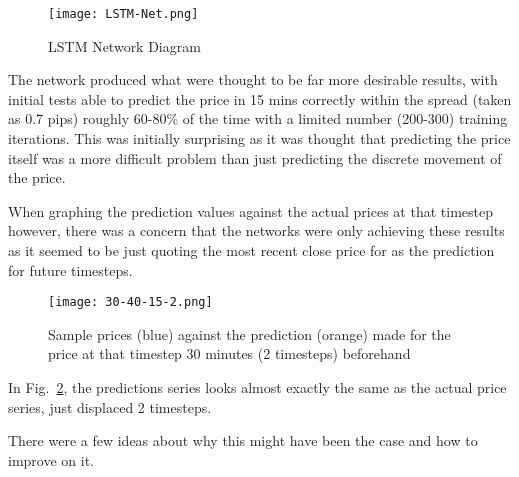             \begin{figure}[htbp]
                \centering
                \texttt{[image: LSTM-Net.png]}
                \caption{LSTM Network Diagram}
                \label{fig:LSTM_Diagram}
            \end{figure}

            The network produced what were thought to be far more desirable results, with initial tests able to predict the price in 15 mins correctly within the spread (taken as 0.7 pips) roughly 60-80\% of the time with a limited number (200-300) training iterations. This was initially surprising as it was thought that predicting the price itself was a more difficult problem than just predicting the discrete movement of the price.

            When graphing the prediction values against the actual prices at that timestep however, there was a concern that the networks were only achieving these results as it seemed to be just quoting the most recent close price for as the prediction for future timesteps.

            \begin{figure}[htbp]
                \centering
                \texttt{[image: 30-40-15-2.png]}
                \caption{Sample prices (blue) against the prediction (orange) made for the price at that timestep 30 minutes (2 timesteps) beforehand}
                \label{fig:30_predictions}
            \end{figure}

            In Fig.~\ref{fig:30_predictions}, the predictions series looks almost exactly the same as the actual price series, just displaced 2 timesteps. 

            There were a few ideas about why this might have been the case and how to improve on it.

